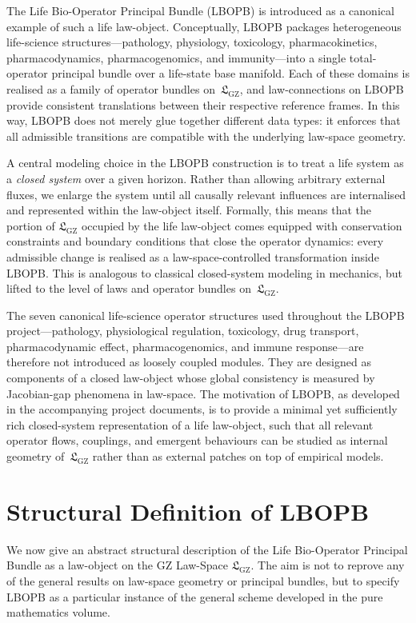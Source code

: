 \documentclass[11pt]{book}
\theoremstyle{plain}
\theoremstyle{definition}
\theoremstyle{remark}
\newcommand{\GZLS}{\ensuremath{\mathfrak{L}_{\mathrm{GZ}}}}       \newcommand{\GZLT}{\ensuremath{M_{!w}}}                           \newcommand{\GZLOC}{\ensuremath{A_M}}                             \newcommand{\GZLCurv}{\ensuremath{\mathcal{F}_{\mathrm{law}}}}
\begin{document}
The Life Bio-Operator Principal Bundle (LBOPB) is introduced as a
canonical example of such a life law-object. Conceptually, LBOPB
packages heterogeneous life-science structures---pathology,
physiology, toxicology, pharmacokinetics, pharmacodynamics,
pharmacogenomics, and immunity---into a single total-operator principal
bundle over a life-state base manifold. Each of these domains is
realised as a family of operator bundles on~$\GZLS$, and law-connections
on LBOPB provide consistent translations between their respective
reference frames. In this way, LBOPB does not merely glue together
different data types: it enforces that all admissible transitions are
compatible with the underlying law-space geometry.

A central modeling choice in the LBOPB construction is to treat a life
system as a \emph{closed system} over a given horizon. Rather than
allowing arbitrary external fluxes, we enlarge the system until all
causally relevant influences are internalised and represented within
the law-object itself. Formally, this means that the portion of
$\GZLS$ occupied by the life law-object comes equipped with
conservation constraints and boundary conditions that close the
operator dynamics: every admissible change is realised as a
law-space-controlled transformation inside LBOPB. This is analogous to
classical closed-system modeling in mechanics, but lifted to the level
of laws and operator bundles on~$\GZLS$.

The seven canonical life-science operator structures used throughout
the LBOPB project---pathology, physiological regulation, toxicology,
drug transport, pharmacodynamic effect, pharmacogenomics, and immune
response---are therefore not introduced as loosely coupled modules.
They are designed as components of a closed law-object whose global
consistency is measured by Jacobian-gap phenomena in law-space. The
motivation of LBOPB, as developed in the accompanying project
documents, is to provide a minimal yet sufficiently rich closed-system
representation of a life law-object, such that all relevant operator
flows, couplings, and emergent behaviours can be studied as internal
geometry of~$\GZLS$ rather than as external patches on top of empirical
models.

\section{Structural Definition of LBOPB}


We now give an abstract structural description of the Life
Bio-Operator Principal Bundle as a law-object on the GZ Law-Space
$\GZLS$. The aim is not to reprove any of the general results on
law-space geometry or principal bundles, but to specify LBOPB as a
particular instance of the general scheme developed in the pure
mathematics volume.
\end{document}
